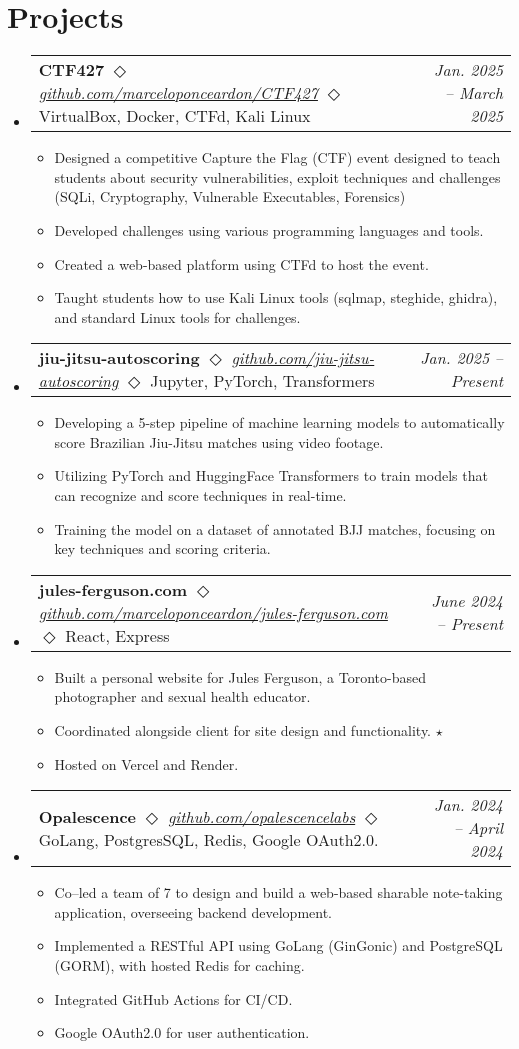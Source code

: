 \documentclass[letterpaper,11pt]{article}
\makeatletter
\newcommand{\resumeItem}[1]{
  \item\small{
    {#1 \vspace{-2pt}}
  }
}
\newcommand{\resumeProjectHeading}[2]{
    \item
    \begin{tabular*}{0.97\textwidth}{l@{\extracolsep{\fill}}r}
      \small#1 & #2 \\
    \end{tabular*}\vspace{-7pt}
}
\newcommand{\resumeSubHeadingListStart}{\begin{itemize}[leftmargin=0.15in, label={}]}
\newcommand{\resumeSubHeadingListEnd}{\end{itemize}}
\newcommand{\resumeItemListStart}{\begin{itemize}}
\newcommand{\resumeItemListEnd}{\end{itemize}\vspace{-5pt}}
\makeatother
\begin{document}
\section{Projects}
    \resumeSubHeadingListStart
      \resumeProjectHeading
      {\textbf{CTF427} $\Diamond$ \textit{\href{https://github.com/marceloponceardon/CTF427}{github.com/marceloponceardon/CTF427}} $\Diamond$ {\footnotesize VirtualBox, Docker, CTFd, Kali Linux}}{\emph{Jan. 2025 -- March 2025}}
          \resumeItemListStart
	  \resumeItem{Designed a competitive Capture the Flag (CTF) event designed to teach students about security vulnerabilities, exploit techniques and challenges (SQLi, Cryptography, Vulnerable Executables, Forensics)}
	  \resumeItem{Developed challenges using various programming languages and tools.}
	  \resumeItem{Created a web-based platform using CTFd to host the event.}
	  \resumeItem{Taught students how to use Kali Linux tools (sqlmap, steghide, ghidra), and standard Linux tools for challenges.}
          \resumeItemListEnd
      \resumeProjectHeading
      {\textbf{jiu-jitsu-autoscoring} $\Diamond$ \textit{\href{https://github.com/jiu-jitsu-autoscoring}{github.com/jiu-jitsu-autoscoring}} $\Diamond$ {\footnotesize Jupyter, PyTorch, Transformers}}{\emph{Jan. 2025 -- Present}}
          \resumeItemListStart
	  \resumeItem{Developing a 5-step pipeline of machine learning models to automatically score Brazilian Jiu-Jitsu matches using video footage.}
	  \resumeItem{Utilizing PyTorch and HuggingFace Transformers to train models that can recognize and score techniques in real-time.}
	  \resumeItem{Training the model on a dataset of annotated BJJ matches, focusing on key techniques and scoring criteria.}
          \resumeItemListEnd
      \resumeProjectHeading
      {\textbf{jules-ferguson.com} $\Diamond$ \textit{\href{https://github.com/marceloponceardon/jules-ferguson.com}{github.com/marceloponceardon/jules-ferguson.com}} $\Diamond$ {\footnotesize React, Express} }{\emph{June 2024 -- Present}}
	  \resumeItemListStart
	  \resumeItem{Built a personal website for Jules Ferguson, a Toronto-based photographer and sexual health educator.}
	  \resumeItem{Coordinated alongside client for site design and functionality. $\star$}
	  \resumeItem{Hosted on Vercel and Render.}
	  \resumeItemListEnd
      \resumeProjectHeading
      {\textbf{Opalescence} $\Diamond$ \textit{\href{https://github.com/opalescencelabs}{github.com/opalescencelabs}} $\Diamond$ {\footnotesize GoLang, PostgresSQL, Redis, Google OAuth2.0.}}{\emph{Jan. 2024 -- April 2024}}
          \resumeItemListStart
	  \resumeItem{Co--led a team of 7 to design and build a web-based sharable note-taking application, overseeing backend development.}
	  \resumeItem{Implemented a RESTful API using GoLang (GinGonic) and PostgreSQL (GORM), with hosted Redis for caching.}
	  \resumeItem{Integrated GitHub Actions for CI/CD.}
	  \resumeItem{Google OAuth2.0 for user authentication.}
          \resumeItemListEnd
    \resumeSubHeadingListEnd
\end{document}
